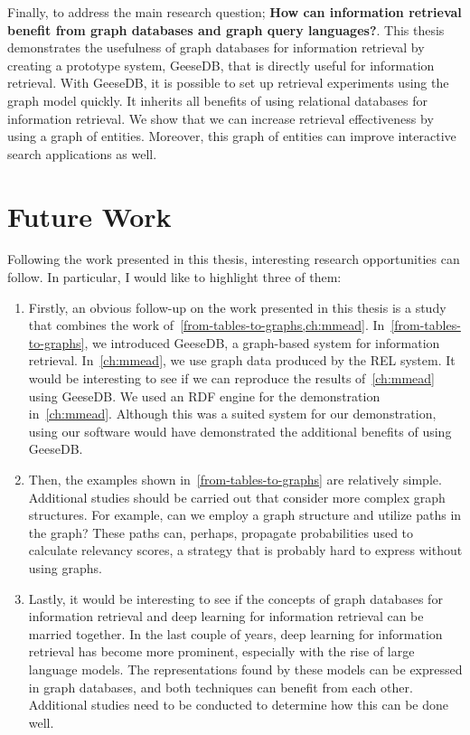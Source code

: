 Finally, to address the main research question; \textbf{How can information retrieval benefit from graph databases and graph query languages?}. This thesis demonstrates the usefulness of graph databases for information retrieval by creating a prototype system, GeeseDB, that is directly useful for information retrieval. With GeeseDB, it is possible to set up retrieval experiments using the graph model quickly. It inherits all benefits of using relational databases for information retrieval. We show that we can increase retrieval effectiveness by using a graph of entities. Moreover, this graph of entities can improve interactive search applications as well.    

\section{Future Work}
Following the work presented in this thesis, interesting research opportunities can follow. In particular, I would like to highlight three of them:
\begin{enumerate}
	\item Firstly, an obvious follow-up on the work presented in this thesis is a study that combines the work of~\cref{from-tables-to-graphs,ch:mmead}. In~\cref{from-tables-to-graphs}, we introduced GeeseDB, a graph-based system for information retrieval. In~\cref{ch:mmead}, we use graph data produced by the REL system. It would be interesting to see if we can reproduce the results of~\cref{ch:mmead} using GeeseDB. We used an RDF engine for the demonstration in~\cref{ch:mmead}. Although this was a suited system for our demonstration, using our software would have demonstrated the additional benefits of using GeeseDB. 
	\item Then, the examples shown in~\cref{from-tables-to-graphs} are relatively simple. Additional studies should be carried out that consider more complex graph structures. For example, can we employ a graph structure and utilize paths in the graph? These paths can, perhaps, propagate probabilities used to calculate relevancy scores, a strategy that is probably hard to express without using graphs. 
	\item Lastly, it would be interesting to see if the concepts of graph databases for information retrieval and deep learning for information retrieval can be married together. In the last couple of years, deep learning for information retrieval has become more prominent, especially with the rise of large language models. The representations found by these models can be expressed in graph databases, and both techniques can benefit from each other. Additional studies need to be conducted to determine how this can be done well. 
\end{enumerate} 